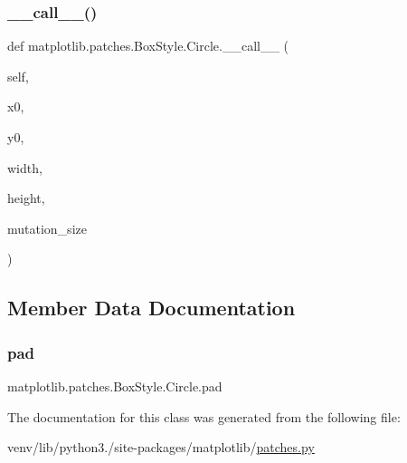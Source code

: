 \subsubsection{\texorpdfstring{\+\_\+\+\_\+call\+\_\+\+\_\+()}{\_\_call\_\_()}}
{\footnotesize\ttfamily def matplotlib.\+patches.\+Box\+Style.\+Circle.\+\_\+\+\_\+call\+\_\+\+\_\+ (\begin{DoxyParamCaption}\item[{}]{self,  }\item[{}]{x0,  }\item[{}]{y0,  }\item[{}]{width,  }\item[{}]{height,  }\item[{}]{mutation\+\_\+size }\end{DoxyParamCaption})}



\subsection{Member Data Documentation}
\mbox{\label{classmatplotlib_1_1patches_1_1BoxStyle_1_1Circle_ac264f4bb6e9af501cd9b9095f985b546}} 
\subsubsection{\texorpdfstring{pad}{pad}}
{\footnotesize\ttfamily matplotlib.\+patches.\+Box\+Style.\+Circle.\+pad}



The documentation for this class was generated from the following file\+:\begin{DoxyCompactItemize}
\item 
venv/lib/python3./site-\/packages/matplotlib/\hyperlink{patches_8py}{patches.\+py}\end{DoxyCompactItemize}
